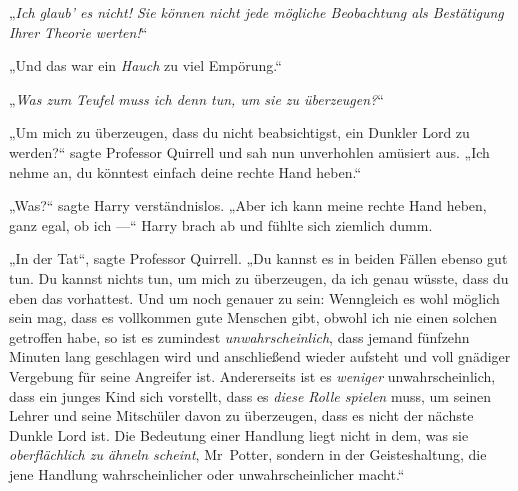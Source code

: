 „\emph{Ich glaub’ es nicht! Sie können nicht jede mögliche Beobachtung als Bestätigung Ihrer Theorie werten!}“

„Und das war ein \emph{Hauch} zu viel Empörung.“

„\emph{Was zum Teufel muss ich denn tun, um sie zu überzeugen?}“

„Um mich zu überzeugen, dass du nicht beabsichtigst, ein Dunkler Lord zu werden?“ sagte Professor Quirrell und sah nun unverhohlen amüsiert aus.
„Ich nehme an, du könntest einfach deine rechte Hand heben.“

„Was?“ sagte Harry verständnislos.
„Aber ich kann meine rechte Hand heben, ganz egal, ob ich —“ Harry brach ab und fühlte sich ziemlich dumm.

„In der Tat“, sagte Professor Quirrell.
„Du kannst es in beiden Fällen ebenso gut tun. Du kannst nichts tun, um mich zu überzeugen, da ich genau wüsste, dass du eben das vorhattest. Und um noch genauer zu sein: Wenngleich es wohl möglich sein mag, dass es vollkommen gute Menschen gibt, obwohl ich nie einen solchen getroffen habe, so ist es zumindest \emph{unwahrscheinlich}, dass jemand fünfzehn Minuten lang geschlagen wird und anschließend wieder aufsteht und voll gnädiger Vergebung für seine Angreifer ist. Andererseits ist es \emph{weniger} unwahrscheinlich, dass ein junges Kind sich vorstellt, dass es \emph{diese Rolle spielen} muss, um seinen Lehrer und seine Mitschüler davon zu überzeugen, dass es nicht der nächste Dunkle Lord ist. Die Bedeutung einer Handlung liegt nicht in dem, was sie \emph{oberflächlich zu ähneln scheint}, Mr~Potter, sondern in der Geisteshaltung, die jene Handlung wahrscheinlicher oder unwahrscheinlicher macht.“

